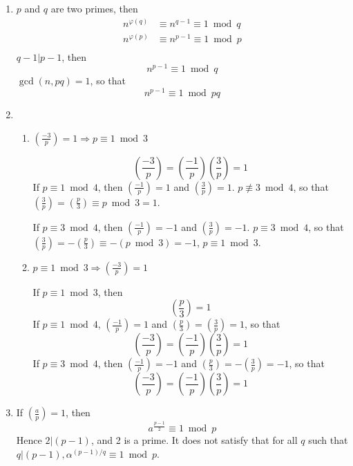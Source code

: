 \documentclass[a4paper]{article}
\begin{document}
\begin{enumerate}
		\item $p$ and $q$ are two primes, then
		\[
		\begin{aligned}
			n^{\varphi(q)} &\equiv n^{q-1} \equiv 1 \bmod q \\
			n^{\varphi(p)} &\equiv n^{p-1} \equiv 1 \bmod p \\
		\end{aligned}
		\]
		$q-1|p-1$, then
		\[
		n^{p-1} \equiv 1 \bmod q
		\]
		$\gcd(n, pq) = 1$, so that
		\[
		n^{p-1} \equiv 1 \bmod pq
		\]

		\item
		\begin{enumerate}[$\bullet$]
			\item $\left( \frac{-3}{p} \right) = 1 \Rightarrow p \equiv 1 \bmod 3$

			\[
			\left( \frac{-3}{p} \right) = \left( \frac{-1}{p} \right) \left( \frac{3}{p} \right) = 1
			\]
			If $p \equiv 1 \bmod 4$, then $\left( \frac{-1}{p} \right) = 1$ and $\left( \frac{3}{p} \right) = 1$. $p \not \equiv 3 \bmod 4$, so that $\left( \frac{3}{p} \right) = \left( \frac{p}{3} \right) \equiv p \bmod 3 = 1$.

			If $p \equiv 3 \bmod 4$, then $\left( \frac{-1}{p} \right) = -1$ and $\left( \frac{3}{p} \right) = -1$. $p \equiv 3 \bmod 4$, so that $\left( \frac{3}{p} \right) = -\left( \frac{p}{3} \right) \equiv -(p \bmod 3) = -1$, $p \equiv 1 \bmod 3$.

			\item $p \equiv 1 \bmod 3 \Rightarrow \left( \frac{-3}{p}\right) = 1$

			If $p \equiv 1 \bmod 3$, then
			\[
			\left( \frac{p}{3} \right) = 1
			\]
			If $p \equiv 1 \bmod 4$, $\left( \frac{-1}{p} \right) = 1$ and $\left( \frac{p}{3} \right) = \left( \frac{3}{p} \right) = 1$, so that
			\[
			\left( \frac{-3}{p} \right) = \left( \frac{-1}{p} \right) \left( \frac{3}{p} \right) = 1
			\]
			If $p \equiv 3 \bmod 4$, then $\left( \frac{-1}{p} \right) = -1$ and $\left( \frac{p}{3} \right) = -\left( \frac{3}{p} \right) = -1$, so that
			\[
			\left( \frac{-3}{p} \right) = \left( \frac{-1}{p} \right) \left( \frac{3}{p} \right) = 1
			\]
		\end{enumerate}

		\item If $\left( \frac{a}{p} \right) = 1$, then
		\[
		a^{\frac{p-1}{2}} \equiv 1 \bmod p
		\]
		Hence $2|(p - 1)$, and 2 is a prime. It does not satisfy that for all $q$ such that $q|(p-1), \alpha^{(p-1)/q} \equiv 1 \bmod p$.
	\end{enumerate}
\end{document}
